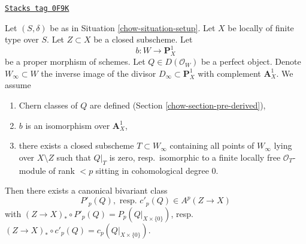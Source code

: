 \begin{lemma}
\label{chow-lemma-localized-chern-pre}
\href{https://stacks.math.columbia.edu/tag/0F9K}{\texttt{Stacks tag 0F9K}}

Let $(S, \delta)$ be as in Situation \ref{chow-situation-setup}. Let $X$ be
locally of finite type over $S$. Let $Z \subset X$ be a closed subscheme.
Let
$$
b : W \longrightarrow \mathbf{P}^1_X
$$
be a proper morphism of schemes. Let $Q \in D(\mathcal{O}_W)$ be a
perfect object. Denote $W_\infty \subset W$ the inverse image of the divisor
$D_\infty \subset \mathbf{P}^1_X$ with complement $\mathbf{A}^1_X$.
We assume
\begin{enumerate}
\item[(A0)] Chern classes of $Q$ are defined
(Section \ref{chow-section-pre-derived}),
\item[(A1)] $b$ is an isomorphism over $\mathbf{A}^1_X$,
\item[(A2)] there exists a closed subscheme $T \subset W_\infty$
containing all points of $W_\infty$ lying over $X \setminus Z$ such that
$Q|_T$ is zero, resp.\ isomorphic to a finite locally free
$\mathcal{O}_T$-module of rank $< p$ sitting in cohomological degree $0$.
\end{enumerate}
Then there exists a canonical bivariant class
$$
P'_p(Q),\text{ resp. }c'_p(Q) \in A^p(Z \to X)
$$
with
$(Z \to X)_* \circ P'_p(Q) = P_p(Q|_{X \times \{0\}})$,
resp.\ $(Z \to X)_* \circ c'_p(Q) = c_p(Q|_{X \times \{0\}})$.
\end{lemma}

